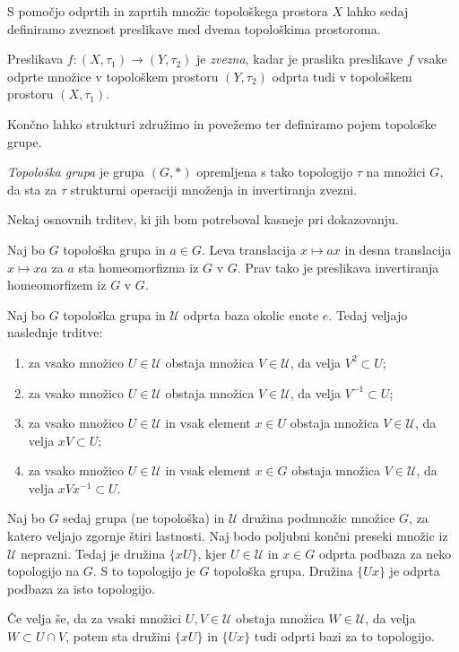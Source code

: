\documentclass[mat1]{fmfdelo}
\newcommand{\Ucurl}{\mathcal{U}}
\begin{document}
S pomočjo odprtih in zaprtih množic topološkega prostora $X$ lahko sedaj definiramo zveznost preslikave med dvema topološkima prostoroma.

\begin{definicija}\label{def:zveznost}
Preslikava $f: (X, \tau_1) \to (Y, \tau_2)$ je \emph{zvezna}, kadar je praslika preslikave $f$ vsake odprte množice v topološkem prostoru $(Y, \tau_2)$ odprta tudi v topološkem prostoru $(X, \tau_1)$.
\end{definicija}

Končno lahko strukturi združimo in povežemo ter definiramo pojem topološke grupe.
\begin{definicija}\label{def:topgrupa}
\emph{Topološka grupa} je grupa $(G, *)$ opremljena s tako topologijo $\tau$ na množici $G$, da sta za $\tau$ strukturni operaciji množenja in invertiranja zvezni. 
\end{definicija}

Nekaj osnovnih trditev, ki jih bom potreboval kasneje pri dokazovanju.

\begin{trditev}\label{trd:trans}
Naj bo $G$ topološka grupa in $a \in G$. Leva translacija $x \mapsto ax$ in desna translacija $x \mapsto xa$ za $a$ sta homeomorfizma iz $G$ v $G$. Prav tako je preslikava invertiranja homeomorfizem iz $G$ v $G$.
\end{trditev}

\begin{trditev}\label{trd:okolice}
Naj bo $G$ topološka grupa in $\Ucurl$ odprta baza okolic enote $e$. Tedaj veljajo naslednje trditve:
\begin{enumerate}
\item za vsako množico $U \in \Ucurl$ obstaja množica $V \in \Ucurl$, da velja $V^{2} \subset U$;
\item za vsako množico $U \in \Ucurl$ obstaja množica $V \in \Ucurl$, da velja $V^{-1} \subset U$;
\item za vsako množico $U \in \Ucurl$ in vsak element $x \in U$ obstaja množica $V \in \Ucurl$, da velja $xV \subset U$;
\item za vsako množico $U \in \Ucurl$ in vsak element $x \in G$ obstaja množica $V \in \Ucurl$, da velja $xVx^{-1} \subset U$.
\end{enumerate}

Naj bo $G$ sedaj grupa (ne topološka) in $\Ucurl$ družina podmnožic množice $G$, za katero veljajo zgornje štiri lastnosti. Naj bodo poljubni končni preseki množic iz $\Ucurl$ neprazni. Tedaj je družina $\lbrace xU \rbrace$, kjer $U \in \Ucurl$ in $x \in G$ odprta podbaza za neko topologijo na $G$. S to topologijo je $G$ topološka grupa. Družina $\lbrace Ux \rbrace$ je odprta podbaza za isto topologijo.

Če velja še, da za vsaki množici $U,V \in \Ucurl$ obstaja množica $W \in \Ucurl$, da velja $W \subset U \cap V$, potem sta družini $\lbrace xU \rbrace$ in $\lbrace Ux \rbrace$ tudi odprti bazi za to topologijo.
\end{trditev}
\end{document}

